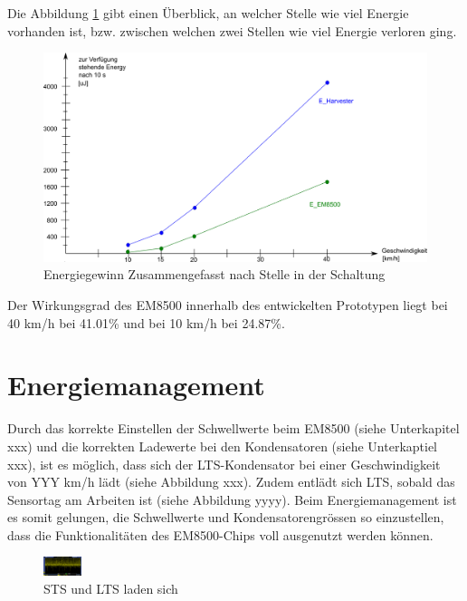 Die Abbildung \ref{zsmEnergyGewinn} gibt einen Überblick, an welcher Stelle wie viel Energie vorhanden ist, bzw. zwischen welchen zwei Stellen wie viel Energie verloren ging.

\begin{figure}[ht]
    \includegraphics[width=1\textwidth]{4Resultate/imag/EnergyGewinnNachStelle.png} 
    \caption{Energiegewinn Zusammengefasst nach Stelle in der Schaltung}
    \label{zsmEnergyGewinn}
\end{figure}

Der Wirkungsgrad des EM8500 innerhalb des entwickelten Prototypen liegt bei 40 km/h  bei 41.01\thinspace\% und bei 10 km/h bei 24.87\thinspace\%.


\section{Energiemanagement}


Durch das korrekte Einstellen der Schwellwerte beim EM8500 (siehe Unterkapitel xxx) und die korrekten Ladewerte bei den Kondensatoren (siehe Unterkaptiel xxx), ist es möglich, dass sich der LTS-Kondensator bei einer Geschwindigkeit von YYY km/h lädt (siehe Abbildung xxx). Zudem entlädt sich LTS, sobald das Sensortag am Arbeiten ist (siehe Abbildung yyyy). Beim Energiemanagement ist es somit gelungen, die Schwellwerte und Kondensatorengrössen so einzustellen, dass die Funktionalitäten des EM8500-Chips voll ausgenutzt werden können.

\begin{figure}[ht]
    \includegraphics[width=0.1\textwidth]{4Resultate/imag/SpannungVCC.png} 
    \caption{STS und LTS laden sich}
\end{figure}

